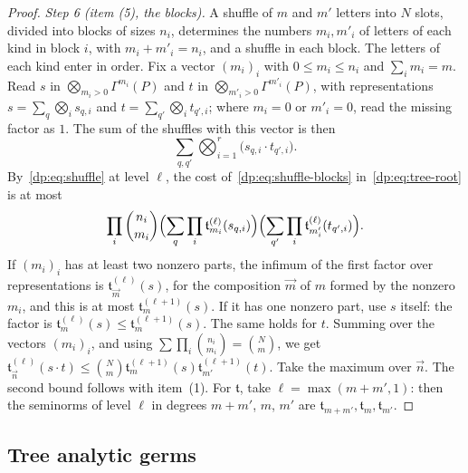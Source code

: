 \begin{proof}
\emph{Step 6 (item (5), the blocks).} A shuffle of $m$ and $m'$ letters into $N$ slots, divided into blocks of sizes $n_i$, determines the numbers $m_i,m'_i$ of letters of each kind in block $i$, with $m_i+m'_i=n_i$, and a shuffle in each block. The letters of each kind enter in order. Fix a vector $(m_i)_i$ with $0\le m_i\le n_i$ and $\sum_im_i=m$. Read $s$ in $\bigotimes_{m_i>0}\Gamma^{m_i}(P)$ and $t$ in $\bigotimes_{m'_i>0}\Gamma^{m'_i}(P)$, with representations $s=\sum_q\bigotimes_is_{q,i}$ and $t=\sum_{q'}\bigotimes_it_{q',i}$; where $m_i=0$ or $m'_i=0$, read the missing factor as $1$. The sum of the shuffles with this vector is then
\begin{equation}\label{dp:eq:shuffle-blocks}
 \sum_{q,q'}\bigotimes_{i=1}^r\bigl(s_{q,i}\cdot t_{q',i}\bigr).
\end{equation}
By~\eqref{dp:eq:shuffle} at level $\ell$, the cost of~\eqref{dp:eq:shuffle-blocks} in~\eqref{dp:eq:tree-root} is at most
\[
 \prod_i\binom{n_i}{m_i}\Bigl(\sum_q\prod_i\mathfrak t^{(\ell)}_{m_i}(s_{q,i})\Bigr)\Bigl(\sum_{q'}\prod_i\mathfrak t^{(\ell)}_{m'_i}(t_{q',i})\Bigr).
\]
If $(m_i)_i$ has at least two nonzero parts, the infimum of the first factor over representations is $\mathfrak t^{(\ell)}_{\vec m}(s)$, for the composition $\vec m$ of $m$ formed by the nonzero $m_i$, and this is at most $\mathfrak t^{(\ell+1)}_m(s)$. If it has one nonzero part, use $s$ itself: the factor is $\mathfrak t^{(\ell)}_m(s)\le\mathfrak t^{(\ell+1)}_m(s)$. The same holds for $t$. Summing over the vectors $(m_i)_i$, and using $\sum\prod_i\binom{n_i}{m_i}=\binom Nm$, we get $\mathfrak t^{(\ell)}_{\vec n}(s\cdot t)\le\binom Nm\mathfrak t^{(\ell+1)}_m(s)\mathfrak t^{(\ell+1)}_{m'}(t)$. Take the maximum over $\vec n$. The second bound follows with item~(1). For $\mathfrak t$, take $\ell=\max(m+m',1)$: then the seminorms of level $\ell$ in degrees $m+m'$, $m$, $m'$ are $\mathfrak t_{m+m'},\mathfrak t_m,\mathfrak t_{m'}$.
\end{proof}

\subsection{Tree analytic germs}\label{dp:ssec:ta}

